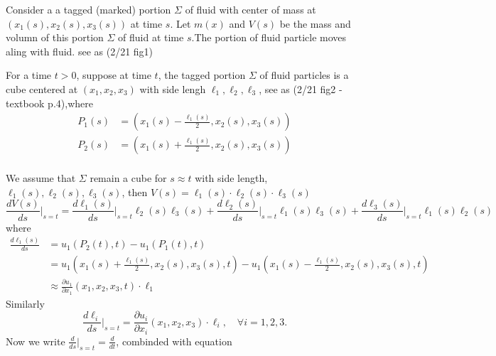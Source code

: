 
\begin{center}\end{center}

Consider a a tagged (marked) portion $\Sigma$ of fluid with center of mass at $(x_1(s), x_2(s), x_3(s))$ at time $s$. Let $m(x)$ and $V(s)$ be the mass and volumn of this portion $\Sigma$ of fluid at time $s$​.The portion of fluid particle moves aling with fluid. see as (2/21 fig1)

\begin{center}\end{center}

For a time $t>0$, suppose at time $t $, the tagged portion $\Sigma$ of fluid particles is a cube centered at $(x_1, x_2, x_3)$ with side lengh $\ell_1,\ell_2,\ell_3$​, see as (2/21 fig2 - textbook p.4),where 
\begin{equation}
\begin{aligned}
P_1(s) &= \left(x_1(s)-\frac{\ell_1(s)}{2},x_2(s),x_3(s)\right)\\
P_2(s) &= \left(x_1(s)+\frac{\ell_1(s)}{2},x_2(s),x_3(s)\right)\\
\end{aligned}
\end{equation}



We assume that $\Sigma$ remain a cube for $s\approx t$ with side length, $\ell_1(s),\ell_2(s),\ell_3(s)$, then $V(s) = \ell_1(s)\cdot\ell_2(s)\cdot\ell_3(s)$
\begin{equation}
\frac{dV(s)}{ds}\Bigg|_{s=t}
=   \frac{d\ell_1(s)}{ds}\Bigg|_{s=t} \ell_2(s)\ell_3(s)
+\frac{d\ell_2(s)}{ds}\Bigg|_{s=t} \ell_1(s)\ell_3(s)
+\frac{d\ell_3(s)}{ds}\Bigg|_{s=t} \ell_1(s)\ell_2(s)
\end{equation}
where
\begin{equation}
\begin{aligned}
\frac{d\ell_1(s)}{ds}
&= u_1(P_2(t),t) - u_1(P_1(t),t)\\
&= u_1\left(x_1(s)+\frac{\ell_1(s)}{2},x_2(s),x_3(s),t\right)
- u_1\left(x_1(s)-\frac{\ell_1(s)}{2},x_2(s),x_3(s),t\right)\\
&\approx \frac{\partial u_1}{\partial x_1}\left(x_1,x_2,x_3,t\right)\cdot \ell_1
\end{aligned}
\end{equation}
Similarly 
\begin{equation}
\frac{d\ell_i}{ds}\Bigg|_{s=t} = \frac{\partial u_i}{\partial x_i}\left(x_1,x_2,x_3\right)\cdot \ell_{i},\quad \forall i=1,2,3.
\end{equation}
Now we write $\displaystyle \frac{d}{ds}\Bigg|_{s=t}=\frac{d}{dt}$, combinded with equation

